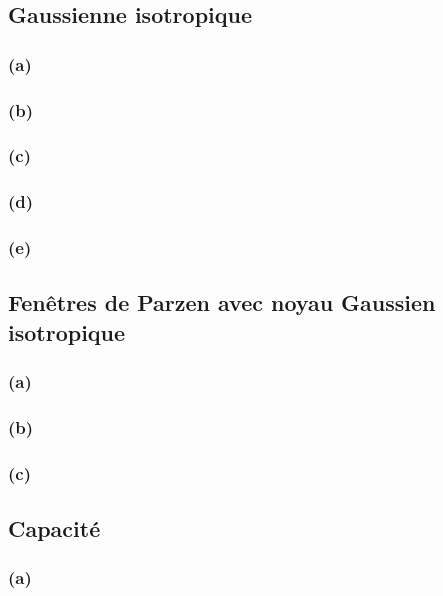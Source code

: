 \documentclass{article}
\begin{document}
	\subsection*{Gaussienne isotropique}
	
	\subsubsection*{(a)}
	
	\subsubsection*{(b)}
	
	\subsubsection*{(c)}
	
	\subsubsection*{(d)}
	
	\subsubsection*{(e)}
	
	
	\subsection{Fenêtres de Parzen avec noyau Gaussien isotropique}
	
	\subsubsection*{(a)}
	
	\subsubsection*{(b)}
	
	\subsubsection*{(c)}
	
	
	\subsection{Capacité}
	
	\subsubsection*{(a)}
	
\end{document}
